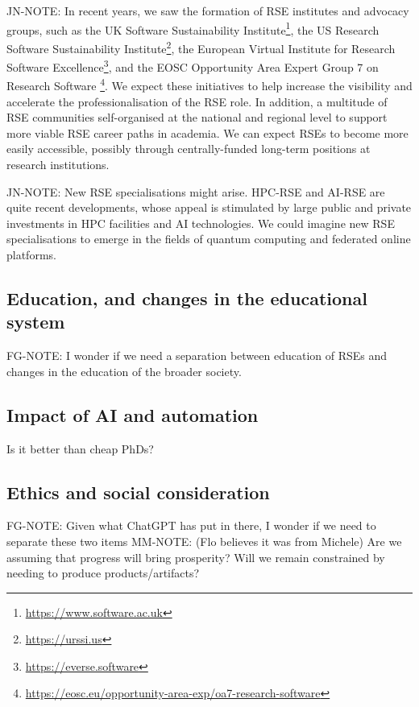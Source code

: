 \documentclass{eceasst}
\begin{document}
\begin{FramedParagraphWithFootnotes}
JN-NOTE:
In recent years, we saw the formation of RSE institutes and advocacy groups, such as
the UK Software Sustainability Institute\footnote{\url{https://www.software.ac.uk}},
the US Research Software Sustainability Institute\footnote{\url{https://urssi.us}},
the European Virtual Institute for Research Software Excellence\footnote{\url{https://everse.software}},
and the EOSC Opportunity Area Expert Group 7 on Research Software%
\footnote{\url{https://eosc.eu/opportunity-area-exp/oa7-research-software}}.
We expect these initiatives to help increase the visibility and accelerate
the professionalisation of the RSE role.
In addition, a multitude of RSE communities self-organised at the national
and regional level to support more viable RSE career paths in academia.
We can expect RSEs to become more easily accessible,
possibly through centrally-funded long-term positions at research institutions.
\end{FramedParagraphWithFootnotes}

\begin{FramedParagraphWithFootnotes}
JN-NOTE:
New RSE specialisations might arise.
HPC-RSE and AI-RSE are quite recent developments,
whose appeal is stimulated by large public and private
investments in HPC facilities and AI technologies.
We could imagine new RSE specialisations to emerge in the fields
of quantum computing and federated online platforms.
\end{FramedParagraphWithFootnotes}


\subsection{Education, and changes in the educational system}
FG-NOTE: I wonder if we need a separation between education of RSEs and changes in the education of the broader society.

\subsection{Impact of AI and automation}
Is it better than cheap PhDs?

\subsection{Ethics and social consideration}
FG-NOTE: Given what ChatGPT has put in there, I wonder if we need to separate these two items
MM-NOTE: (Flo believes it was from Michele) Are we assuming that progress will bring prosperity? Will we remain constrained by needing to produce products/artifacts?
\end{document}
